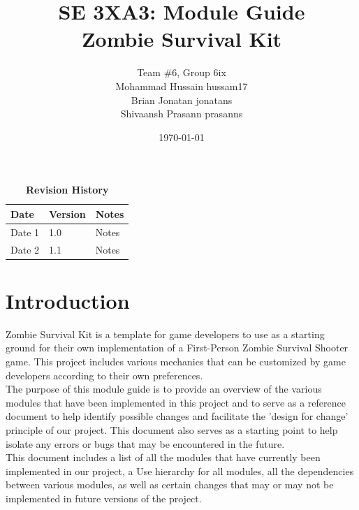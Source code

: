 \documentclass[12pt, titlepage]{article}
\title{SE 3XA3: Module Guide\\Zombie Survival Kit}
\author{Team \#6, Group 6ix
		\\ Mohammad Hussain hussam17
		\\ Brian Jonatan jonatans
		\\ Shivaansh Prasann prasanns
}
\date{\today}
\begin{document}
\maketitle

\tableofcontents
\listoftables
\listoffigures

\begin{table}[bp]
\caption{\bf Revision History}
\begin{tabularx}{\textwidth}{p{3cm}p{2cm}X}
\toprule {\bf Date} & {\bf Version} & {\bf Notes}\\
\midrule
Date 1 & 1.0 & Notes\\
Date 2 & 1.1 & Notes\\
\bottomrule
\end{tabularx}
\end{table}

\newpage


\section{Introduction}


Zombie Survival Kit is a template for game developers to use as a starting ground for their own implementation of a First-Person Zombie Survival Shooter game. This project includes various mechanics that can be customized by game developers according to their own preferences.\\
\newline
The purpose of this module guide is to provide an overview of the various modules that have been implemented in this project and to serve as a reference document to help identify possible changes and facilitate the 'design for change' principle of our project. This document also serves as a starting point to help isolate any errors or bugs that may be encountered in the future.\\
\newline
This document includes a list of all the modules that have currently been implemented in our project, a Use hierarchy for all modules, all the dependencies between various modules, as well as certain changes that may or may not be implemented in future versions of the project.

\newpage
\end{document}

